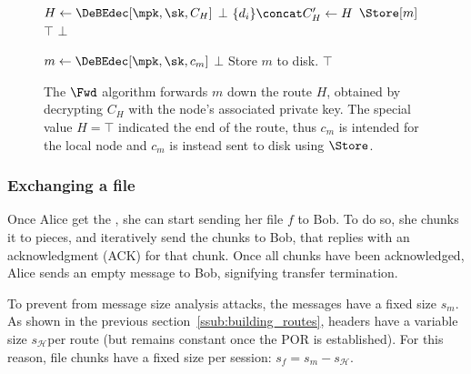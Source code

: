 \begin{figure}[t]
  \begin{algorithmic}[1]
      \State $H\gets \DeBEdec[\mpk, \sk, C_H]$
        \State \Return $\bot$
      \EndIf
      \State $\{d_i\}\concat C_H'\gets H$
        \State \Return $\Store[m]$
      \EndIf
          \State \Return $\top$
        \EndIf
      \EndFor
      \State \Return $\bot$
    \EndFunction
  \end{algorithmic}

  \begin{algorithmic}[1]
      \State $m\gets \DeBEdec[\mpk, \sk, c_m]$
        \State \Return $\bot$
      \EndIf
      \State Store $m$ to disk.
      \State \Return $\top$
    \EndFunction
  \end{algorithmic}
  \caption{\label{SPORFwd}%
    The \(\Fwd\) algorithm forwards \(m\) down the route \(H\), obtained 
    by decrypting \(C_H\) with the node's associated private key.
    The special value \(H = \top\) indicated the end of the route, thus \(c_m\) 
    is intended for the local node and \(c_m\) is instead sent to disk using 
    \(\Store\).%
  }
\end{figure}

\subsubsection{Exchanging a file} %
\label{ssub:exchanging_a_file}

\newcommand{\messagesize}{\ensuremath{s_m}}
\newcommand{\filesize}{\ensuremath{s_f}}
\newcommand{\headersize}{\ensuremath{s_{\mathcal{H}}}}

Once Alice get the \Hforward, she can start sending her file $f$ to Bob. 
To do so, she chunks it to pieces, and iteratively send the chunks to Bob, that replies with an acknowledgment (ACK) for that chunk.
Once all chunks have been acknowledged, Alice sends an empty message to Bob, signifying transfer termination.

To prevent \name from message size analysis attacks, the messages have a fixed size \messagesize.
As shown in the previous section~\ref{ssub:building_routes}, headers have a variable size \headersize per route (but \Hforward remains constant once the POR is established).
For this reason, file chunks have a fixed size per session: $\filesize = \messagesize - \headersize$.

